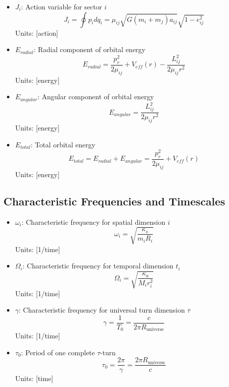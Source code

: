 \documentclass{article}
\begin{document}
\begin{itemize}
\item $J_i$: Action variable for sector $i$
    \begin{equation}
    J_i = \oint p_i dq_i = \mu_{ij}\sqrt{G(m_i+m_j)a_{ij}}\sqrt{1-e_{ij}^2}
    \end{equation}
    Units: [action]
    
\item $E_{radial}$: Radial component of orbital energy
    \begin{equation}
    E_{radial} = \frac{p_r^2}{2\mu_{ij}} + V_{eff}(r) - \frac{L_{ij}^2}{2\mu_{ij}r^2}
    \end{equation}
    Units: [energy]
    
\item $E_{angular}$: Angular component of orbital energy
    \begin{equation}
    E_{angular} = \frac{L_{ij}^2}{2\mu_{ij}r^2}
    \end{equation}
    Units: [energy]
    
\item $E_{total}$: Total orbital energy
    \begin{equation}
    E_{total} = E_{radial} + E_{angular} = \frac{p_r^2}{2\mu_{ij}} + V_{eff}(r)
    \end{equation}
    Units: [energy]
\end{itemize}

\subsection{Characteristic Frequencies and Timescales}

\begin{itemize}
\item $\omega_i$: Characteristic frequency for spatial dimension $i$
    \begin{equation}
    \omega_i = \sqrt{\frac{\kappa_s}{m_i R_i}}
    \end{equation}
    Units: [1/time]
    
\item $\Omega_i$: Characteristic frequency for temporal dimension $t_i$
    \begin{equation}
    \Omega_i = \sqrt{\frac{\kappa_a}{M_i r_i^2}}
    \end{equation}
    Units: [1/time]
    
\item $\gamma$: Characteristic frequency for universal turn dimension $\tau$
    \begin{equation}
    \gamma = \frac{1}{T_0} = \frac{c}{2\pi R_{\text{universe}}}
    \end{equation}
    Units: [1/time]
    
\item $\tau_0$: Period of one complete $\tau$-turn
    \begin{equation}
    \tau_0 = \frac{2\pi}{\gamma} = \frac{2\pi R_{\text{universe}}}{c}
    \end{equation}
    Units: [time]
\end{itemize}
\end{document}
